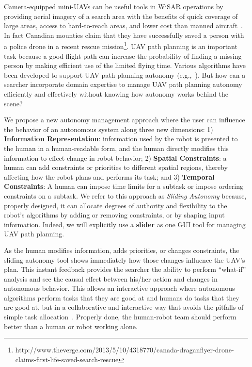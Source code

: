 \documentclass[lettersize, apacite, twoside, HRI]{apa_HRI}
\begin{document}
Camera-equipped mini-UAVs can be useful tools in WiSAR operations by providing aerial imagery of a search area with the benefits of quick coverage of large areas, access to hard-to-reach areas, and lower cost than manned aircraft~\cite{Murphy2008Cooperative, Goodrich2008Supporting}. In fact Canadian mounties claim that they have successfully saved a person with a police drone in a recent rescue mission\footnote{http://www.theverge.com/2013/5/10/4318770/canada-draganflyer-drone-claims-first-life-saved-search-rescue}. UAV path planning is an important task because a good flight path can increase the probability of finding a missing person by making efficient use of the limited flying time. Various algorithms have been developed to support UAV path planning autonomy (e.g.,~\cite{Bourgault2003Coordinated, Lin2009UAV, Lin2014Hierarchical}). But how can a searcher incorporate domain expertise to manage UAV path planning autonomy efficiently and effectively without knowing how autonomy works behind the scene?
 
We propose a new autonomy management approach where the user can influence the behavior of an autonomous system along three new dimensions: 1) \textbf{Information Representation}: information used by the robot is presented to the human in a human-readable form, and the human directly modifies this information to effect change in robot behavior; 2) \textbf{Spatial Constraints}: a human can add constraints or priorities to different spatial regions, thereby affecting how the robot plans and performs its task; and 3) \textbf{Temporal Constraints}: A human can impose time limits for a subtask or impose ordering constraints on a subtask. We refer to this approach as \textit{Sliding Autonomy} because, properly designed, it can allocate degrees of authority and flexibility to the robot's algorithms by adding or removing constraints, or by shaping input information. Indeed, we will explicitly use a \textbf{slider} as one GUI tool for managing UAV path planning. \

As the human modifies information, adds priorities, or changes constraints, the sliding autonomy tool shows immediately how those changes influence the UAV's plan. This instant feedback provides the searcher the ability to perform ``what-if'' analysis and see the causal effect between his/her action and changes in autonomous behavior. This allows an interactive approach where autonomous algorithms perform tasks that they are good at and humans do tasks that they are good at, but in a collaborative and interactive way that avoids the pitfalls of simple task allocation~\cite{Sheridan1992Telerobotics}. Properly done, the human-robot team should perform better than a human or robot working alone. 
\end{document}
